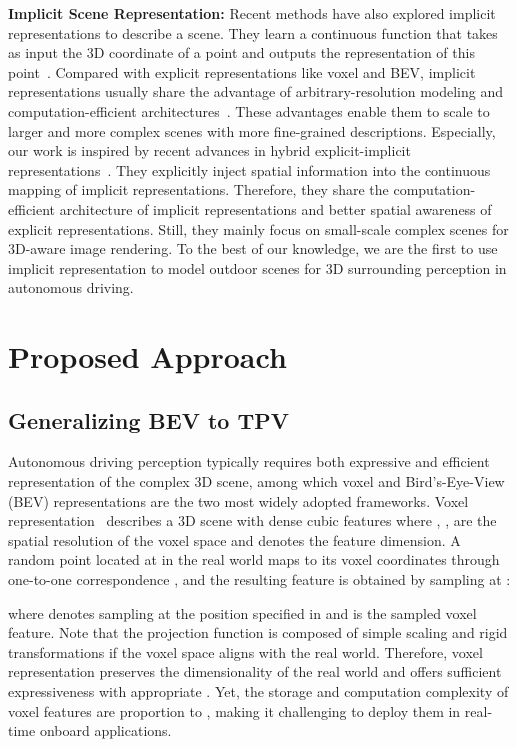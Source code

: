 \documentclass[10pt,twocolumn,letterpaper]{article}
\begin{document}
\textbf{Implicit Scene Representation:}
Recent methods have also explored implicit representations to describe a scene.
They learn a continuous function that takes as input the 3D coordinate of a point and outputs the representation of this point~\cite{mescheder2019occupancy,nerf,deepsdf}.
Compared with explicit representations like voxel and BEV, implicit representations usually share the advantage of arbitrary-resolution modeling and computation-efficient architectures~\cite{chabra2020deep,chen2021learning,reiser2021kilonerf}.
These advantages enable them to scale to larger and more complex scenes with more fine-grained descriptions. 
Especially, our work is inspired by recent advances in hybrid explicit-implicit representations~\cite{triplane,tensorf}.
They explicitly inject spatial information into the continuous mapping of implicit representations.
Therefore, they share the computation-efficient architecture of implicit representations and better spatial awareness of explicit representations.
Still, they mainly focus on small-scale complex scenes for 3D-aware image rendering.
To the best of our knowledge, we are the first to use implicit representation to model outdoor scenes for 3D surrounding perception in autonomous driving. \section{Proposed Approach}


\subsection{Generalizing BEV to TPV}
Autonomous driving perception typically requires both expressive and efficient representation of the complex 3D scene, among which voxel and Bird's-Eye-View (BEV) representations are the two most widely adopted frameworks.
Voxel representation~\cite{drinet++,spvnas,uvtr} describes a 3D scene with dense cubic features  where , ,  are the spatial resolution of the voxel space and  denotes the feature dimension.
A random point located at  in the real world maps to its voxel coordinates  through one-to-one correspondence , and the resulting feature  is obtained by sampling  at :

where  denotes sampling  at the position specified in  and  is the sampled voxel feature.
Note that the projection function  is composed of simple scaling and rigid transformations if the voxel space aligns with the real world.
Therefore, voxel representation preserves the dimensionality of the real world and offers sufficient expressiveness with appropriate .
Yet, the storage and computation complexity of voxel features are proportion to , making it challenging to deploy them in real-time onboard applications.
\end{document}
